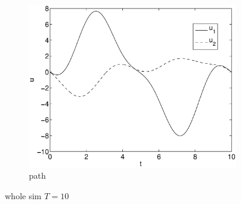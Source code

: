 \begin{figure}[h]
\begin{subfigure}[b]{\textwidth}
\centering
\includegraphics[height=0.3\textheight]{img/final_15_1_10_u.eps}
\caption{path}
\end{subfigure}
\caption{whole sim $T=10$}
\end{figure}

